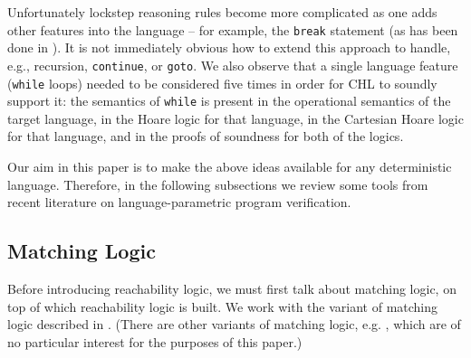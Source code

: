 Unfortunately lockstep reasoning rules become more complicated as one adds other features into the language
-- for example, the \texttt{break} statement (as has been done in \cite{SousaD16}).
It is not immediately obvious how to extend this approach to handle, e.g., recursion, \texttt{continue}, or \texttt{goto}.
We also observe that a single language feature (\texttt{while} loops) needed to be considered five times
in order for CHL to soundly support it: the semantics of \texttt{while} is present in the operational semantics of
the target language, in the Hoare logic for that language, in the Cartesian Hoare logic for that language,
and in the proofs of soundness for both of the logics.

Our aim in this paper is to make the above ideas available for any deterministic language.
Therefore, in the following subsections we review some tools from recent literature
on language-parametric program verification.

\subsection{Matching Logic}

Before introducing reachability logic, we must first talk about matching
logic, on top of which reachability logic is built. We work with the variant of matching logic described in
\cite{StefanescuCMMSR19, RosuSCM13lics}. (There are other variants of matching
logic, e.g. \cite{MmL, MLexplained}, which are of no particular interest for
the purposes of this paper.)





